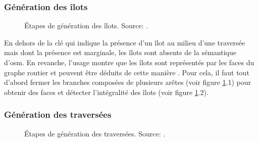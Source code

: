 \subsubsection{Génération des îlots}

\begin{figure}[ht]
    \centering
    \caption[Génération d'îlots]{Étapes de génération des îlots. Source: \citep{Kalsron2022}.}
    \label{fig:modelisation_calcul_pieton_ilots}
\end{figure}

En dehors de la clé  qui indique la présence d'un îlot au milieu d'une traversée mais dont la présence est marginale, les îlots sont absents de la sémantique d'\gls{osm}. En revanche, l'usage montre que les îlots sont représentés par les faces du graphe routier et peuvent être déduits de cette manière \citep{Vitalis2022}. Pour cela, il faut tout d'abord fermer les branches composées de plusieurs arêtes (voir figure \ref{fig:modelisation_calcul_pieton_ilots}.1) pour obtenir des faces et détecter l'intégralité des îlots (voir figure \ref{fig:modelisation_calcul_pieton_ilots}.2).

\subsubsection{Génération des traversées}

\begin{figure}[ht]
    \centering
    \caption[Génération de traversées]{Étapes de génération des traversées. Source: \citep{Kalsron2022}.}
    \label{fig:modelisation_calcul_pieton_traversees}
\end{figure}

